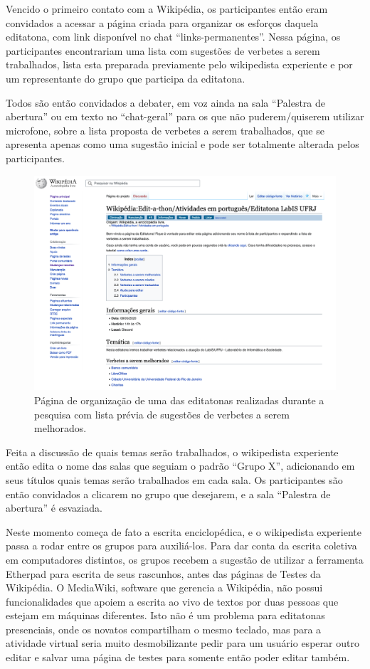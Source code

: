  Vencido o primeiro contato com a Wikipédia, os participantes então eram convidados a acessar a página criada para organizar os esforços daquela editatona, com link disponível no chat “links-permanentes”. Nessa página, os participantes encontrariam uma lista com sugestões de verbetes a serem trabalhados, lista esta preparada previamente pelo wikipedista experiente e por um representante do grupo que participa da editatona.
 
 Todos são então convidados a debater, em voz ainda na sala “Palestra de abertura” ou em texto no “chat-geral” para os que não puderem/quiserem utilizar microfone, sobre a lista proposta de verbetes a serem trabalhados, que se apresenta apenas como uma sugestão inicial e pode ser totalmente alterada pelos participantes.

\begin{figure}[H]
    \centering
    \includegraphics[width=1\textwidth]{Images/pagina_editatona.png}
    \caption{Página de organização de uma das editatonas realizadas durante a pesquisa com lista prévia de sugestões de verbetes a serem melhorados.}
    \label{fig:pagina_editatona}
\end{figure}

 Feita a discussão de quais temas serão trabalhados, o wikipedista experiente então edita o nome das salas que seguiam o padrão ``Grupo X'', adicionando em seus títulos quais temas serão trabalhados em cada sala. Os participantes são então convidados a clicarem no grupo que desejarem, e a sala ``Palestra de abertura'' é esvaziada.
 
 Neste momento começa de fato a escrita enciclopédica, e o wikipedista experiente passa a rodar entre os grupos para auxiliá-los. Para dar conta da escrita coletiva em computadores distintos, os grupos recebem a sugestão de utilizar a ferramenta Etherpad para escrita de seus rascunhos, antes das páginas de Testes da Wikipédia. O MediaWiki, software que gerencia a Wikipédia, não possui funcionalidades que apoiem a escrita ao vivo de textos por duas pessoas que estejam em máquinas diferentes. Isto não é um problema para editatonas presenciais, onde os novatos compartilham o mesmo teclado, mas para a atividade virtual seria muito desmobilizante pedir para um usuário esperar outro editar e salvar uma página de testes para somente então poder editar também.
 
